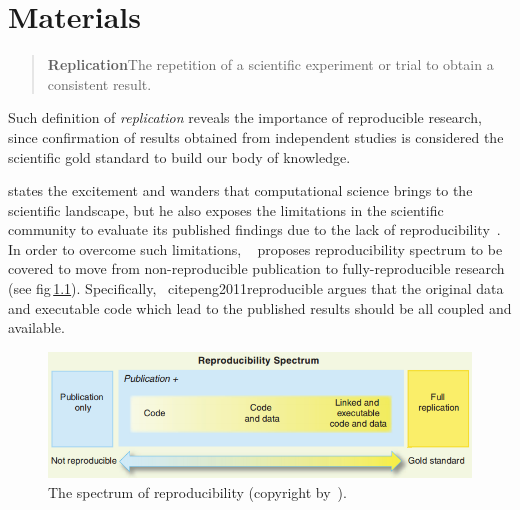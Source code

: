 \acresetall
\graphicspath{{4_materials/figures/}}
\chapter{Materials}\label{chap:4}

\begin{quote}
  \textbf{Replication}\quad The repetition of a scientific
  experiment or trial to obtain a consistent result.
\end{quote}

\noindent Such definition of \emph{replication} reveals the importance of reproducible research, since confirmation of results obtained from independent studies is considered the scientific gold standard to build our body of knowledge.

\citeauthor{peng2011reproducible} states the excitement and wanders that computational science brings to the scientific landscape, but he also exposes the limitations in the scientific community to evaluate its published findings due to the lack of reproducibility~\cite{peng2011reproducible}.
In order to overcome such limitations, \citeauthor{peng2011reproducible}~\cite{peng2011reproducible} proposes reproducibility spectrum to be covered to move from non-reproducible publication to fully-reproducible research (see \acs{fig}\,\ref{fig:reproducibility_spectrum}).
Specifically, \citeauthor{peng2011reproducible}~cite{peng2011reproducible} argues that the original data and executable code which lead to the published results should be all coupled and available. 

\begin{figure}
\centering
\includegraphics[width=.7\textwidth]{reproducibility_spectrum}
\caption[The spectrum of reproducibility.]{The spectrum of reproducibility (copyright by~\cite{peng2011reproducible}).}
\label{fig:reproducibility_spectrum}
\end{figure}

